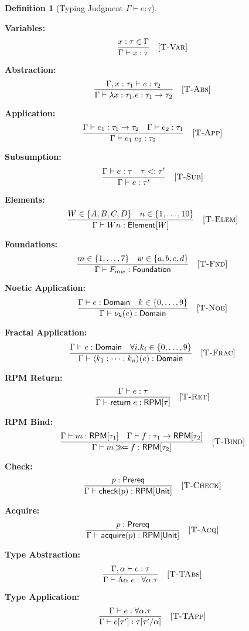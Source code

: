 \documentclass[11pt,twoside,openright]{book}
\theoremstyle{definition}
\newtheorem{definition}{Definition}[chapter]
\theoremstyle{plain}
\theoremstyle{remark}
\newcommand{\noe}[1]{\nu_{#1}}
\newcommand{\rpmret}{\mathsf{return}}
\newcommand{\rpmbind}{\mathbin{\gg\!=}}
\newcommand{\subtype}{<:}
\begin{document}
\begin{definition}[Typing Judgment $\Gamma \vdash e : \tau$]
\label{def:typing-rules-complete}

\textbf{Variables:}
\[
\frac{x : \tau \in \Gamma}{\Gamma \vdash x : \tau} \quad [\textsc{T-Var}]
\]

\textbf{Abstraction:}
\[
\frac{\Gamma, x : \tau_1 \vdash e : \tau_2}{\Gamma \vdash \lambda x:\tau_1. e : \tau_1 \to \tau_2} \quad [\textsc{T-Abs}]
\]

\textbf{Application:}
\[
\frac{\Gamma \vdash e_1 : \tau_1 \to \tau_2 \quad \Gamma \vdash e_2 : \tau_1}{\Gamma \vdash e_1\; e_2 : \tau_2} \quad [\textsc{T-App}]
\]

\textbf{Subsumption:}
\[
\frac{\Gamma \vdash e : \tau \quad \tau \subtype \tau'}{\Gamma \vdash e : \tau'} \quad [\textsc{T-Sub}]
\]

\textbf{Elements:}
\[
\frac{W \in \{A, B, C, D\} \quad n \in \{1, \ldots, 10\}}{\Gamma \vdash Wn : \mathsf{Element}[W]} \quad [\textsc{T-Elem}]
\]

\textbf{Foundations:}
\[
\frac{m \in \{1, \ldots, 7\} \quad w \in \{a, b, c, d\}}{\Gamma \vdash F_{mw} : \mathsf{Foundation}} \quad [\textsc{T-Fnd}]
\]

\textbf{Noetic Application:}
\[
\frac{\Gamma \vdash e : \mathsf{Domain} \quad k \in \{0, \ldots, 9\}}{\Gamma \vdash \noe{k}(e) : \mathsf{Domain}} \quad [\textsc{T-Noe}]
\]

\textbf{Fractal Application:}
\[
\frac{\Gamma \vdash e : \mathsf{Domain} \quad \forall i. k_i \in \{0, \ldots, 9\}}{\Gamma \vdash \langle k_1 : \cdots : k_n \rangle(e) : \mathsf{Domain}} \quad [\textsc{T-Frac}]
\]

\textbf{RPM Return:}
\[
\frac{\Gamma \vdash e : \tau}{\Gamma \vdash \rpmret\; e : \mathsf{RPM}[\tau]} \quad [\textsc{T-Ret}]
\]

\textbf{RPM Bind:}
\[
\frac{\Gamma \vdash m : \mathsf{RPM}[\tau_1] \quad \Gamma \vdash f : \tau_1 \to \mathsf{RPM}[\tau_2]}{\Gamma \vdash m \rpmbind f : \mathsf{RPM}[\tau_2]} \quad [\textsc{T-Bind}]
\]

\textbf{Check:}
\[
\frac{p : \mathsf{Prereq}}{\Gamma \vdash \mathsf{check}(p) : \mathsf{RPM}[\mathsf{Unit}]} \quad [\textsc{T-Check}]
\]

\textbf{Acquire:}
\[
\frac{p : \mathsf{Prereq}}{\Gamma \vdash \mathsf{acquire}(p) : \mathsf{RPM}[\mathsf{Unit}]} \quad [\textsc{T-Acq}]
\]

\textbf{Type Abstraction:}
\[
\frac{\Gamma, \alpha \vdash e : \tau}{\Gamma \vdash \Lambda \alpha. e : \forall \alpha. \tau} \quad [\textsc{T-TAbs}]
\]

\textbf{Type Application:}
\[
\frac{\Gamma \vdash e : \forall \alpha. \tau}{\Gamma \vdash e[\tau'] : \tau[\tau'/\alpha]} \quad [\textsc{T-TApp}]
\]
\end{definition}
\end{document}
